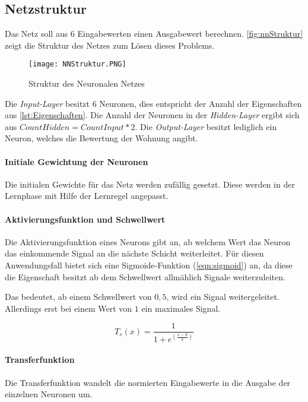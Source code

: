 \subsection{Netzstruktur}
Das Netz soll aus $6$ Eingabewerten einen Ausgabewert berechnen.
\autoref{fig:nnStruktur} zeigt die Struktur des Netzes zum Lösen
dieses Problems.
\begin{figure}[ht]
    \centering
    \texttt{[image: NNStruktur.PNG]}
    \caption{Struktur des Neuronalen Netzes}
    \label{fig:nnStruktur}
\end{figure}

Die \textit{Input-Layer} besitzt $6$ Neuronen, dies entspricht der
Anzahl der Eigenschaften aus \autoref{lst:Eigenschaften}.
Die Anzahl der Neuronen in der \textit{Hidden-Layer} ergibt sich aus
$CountHidden = CountInput * 2$. Die \textit{Output-Layer} besitzt
lediglich ein Neuron, welches die Bewertung der Wohnung angibt.

\paragraph{Initiale Gewichtung der Neuronen}
Die initialen Gewichte für das Netz werden zufällig gesetzt. Diese werden in der Lernphase
mit Hilfe der Lernregel angepasst.

\paragraph{Aktivierungsfunktion und Schwellwert}
Die Aktivierungsfunktion eines Neurons gibt an, ab welchem Wert das Neuron das
einkommende Signal an die nächste Schicht weiterleitet.
Für diesen Anwendungsfall bietet sich eine Sigmoide-Funktion (\autoref{eqn:sigmoid}) an,
da diese die Eigenschaft besitzt ab dem Schwellwert allmählich
Signale weiterzuleiten.

Das bedeutet, ab einem Schwellwert von $0,5$, wird ein Signal weitergeleitet.
Allerdings erst bei einem Wert von $1$ ein maximales Signal.

\begin{equation}
    T_s(x) = \frac{1}{1+e^(\frac{x-S}{k})}
    \label{eqn:sigmoid}
\end{equation}


\paragraph{Transferfunktion}
Die Transferfunktion wandelt die normierten Eingabewerte in die Ausgabe der einzelnen Neuronen um.

